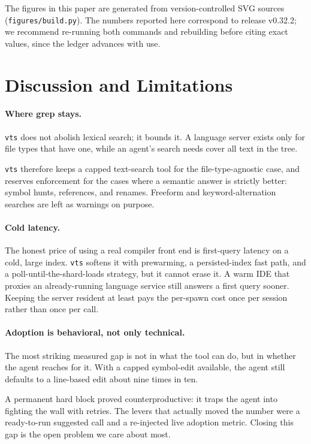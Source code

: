\documentclass[11pt]{article}
\begin{document}
The figures in this paper are generated from version-controlled SVG sources
(\texttt{figures/build.py}). The numbers reported here correspond to release
v0.32.2; we recommend re-running both commands and rebuilding before citing exact
values, since the ledger advances with use.

\section{Discussion and Limitations}
\label{sec:discuss}

\paragraph{Where grep stays.}
\texttt{vts} does not abolish lexical search; it bounds it. A language server exists
only for file types that have one, while an agent's search needs cover all text in
the tree.

\texttt{vts} therefore keeps a capped text-search tool for the file-type-agnostic
case, and reserves enforcement for the cases where a semantic answer is strictly
better: symbol hunts, references, and renames. Freeform and keyword-alternation
searches are left as warnings on purpose.

\paragraph{Cold latency.}
The honest price of using a real compiler front end is first-query latency on a
cold, large index. \texttt{vts} softens it with prewarming, a persisted-index fast
path, and a poll-until-the-shard-loads strategy, but it cannot erase it. A warm IDE
that proxies an already-running language service still answers a first query sooner.
Keeping the server resident at least pays the per-spawn cost once per session rather
than once per call.

\paragraph{Adoption is behavioral, not only technical.}
The most striking measured gap is not in what the tool can do, but in whether the
agent reaches for it. With a capped symbol-edit available, the agent still defaults
to a line-based edit about nine times in ten.

A permanent hard block proved counterproductive: it traps the agent into fighting
the wall with retries. The levers that actually moved the number were a ready-to-run
suggested call and a re-injected live adoption metric. Closing this gap is the open
problem we care about most.
\end{document}
